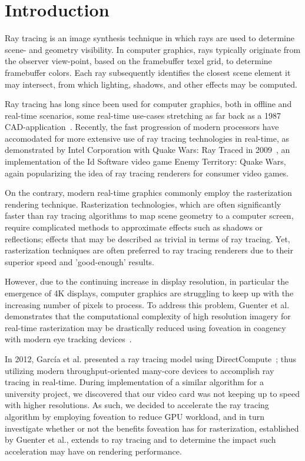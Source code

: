 \section{Introduction}
Ray tracing is an image synthesis technique in which rays are used to determine scene- and geometry visibility.
In computer graphics, rays typically originate from the observer view-point, based on the framebuffer texel grid, to determine framebuffer colors.
Each ray subsequently identifies the closest scene element it may intersect, from which lighting, shadows, and other effects may be computed.

Ray tracing has long since been used for computer graphics, both in offline and real-time scenarios, some real-time use-cases stretching as far back as a 1987 CAD-application~\cite{stay87}.
Recently, the fast progression of modern processors have accomodated for more extensive use of ray tracing technologies in real-time, as demonstrated by Intel Corporation with Quake Wars: Ray Traced in 2009~\cite{pohl09}, an implementation of the Id Software video game Enemy Territory: Quake Wars, again popularizing the idea of ray tracing renderers for consumer video games.

On the contrary, modern real-time graphics commonly employ the rasterization rendering technique.
Rasterization technologies, which are often significantly faster than ray tracing algorithms to map scene geometry to a computer screen, require complicated methods to approximate effects such as shadows or reflections; effects that may be described as trivial in terms of ray tracing.
Yet, rasterization techniques are often preferred to ray tracing renderers due to their superior speed and 'good-enough' results.

However, due to the continuing increase in display resolution, in particular the emergence of 4K displays, computer graphics are struggling to keep up with the increasing number of pixels to process.
To address this problem, Guenter et al. demonstrates that the computational complexity of high resolution imagery for real-time rasterization may be drastically reduced using foveation in coagency with modern eye tracking devices~\cite{guenter12}.

In 2012, Garc\'ia et al. presented a ray tracing model using DirectCompute~\cite{garcia12}; thus utilizing modern throughput-oriented many-core devices to accomplish ray tracing in real-time.
During implementation of a similar algorithm for a university project, we discovered that our video card was not keeping up to speed with higher resolutions.
As such, we decided to accelerate the ray tracing algorithm by employing foveation to reduce GPU workload, and in turn investigate whether or not the benefits foveation has for rasterization, established by Guenter et al., extends to ray tracing and to determine the impact such acceleration may have on rendering performance.

